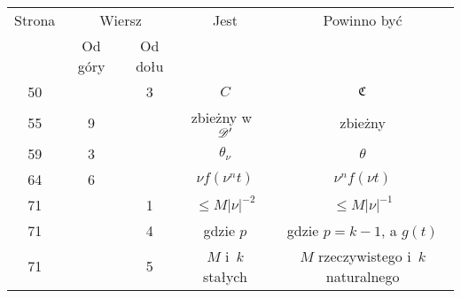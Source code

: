 \documentclass[a4paper,11pt]{article}
\numberwithin{equation}{section}
\begin{document}
\begin{center}
  \begin{tabular}{|c|c|c|c|c|}
    \hline
    Strona & \multicolumn{2}{c|}{Wiersz} & Jest
                              & Powinno być \\ \cline{2-3}
    & Od góry & Od dołu & & \\
    \hline
    50  & & \hphantom{0}3 & $C$ & $\mathfrak{C}$ \\
    55  & \hphantom{0}9 & & zbieżny w~$\mathcal{D}'$ & zbieżny \\
    59  & \hphantom{0}3 & & $\theta_{ \nu }$ & $\theta$ \\
    64  & \hphantom{0}6 & & $\nu f( \nu^{ n } t )$ & $\nu^{ n } f( \nu t )$ \\
    71 & & \hphantom{0}1 & $\leq M | \nu |^{ -2 }$ & $\leq M | \nu |^{ -1 }$ \\
    71 & & \hphantom{0}4 & gdzie $p$ & gdzie $p = k - 1$, a $g( t )$ \\
    71 & & \hphantom{0}5 & $M$ i~$k$ stałych
    & $M$ rzeczywistego i~$k$ naturalnego \\
    \hline
  \end{tabular}

\end{center}

\VerSpaceSix
\end{document}

